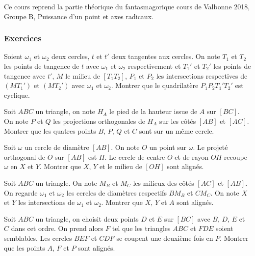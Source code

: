Ce cours reprend la partie théorique du fantasmagorique cours de Valbonne 2018, Groupe B, Puissance d’un point et axes radicaux.


\subsubsection{Exercices}

\begin{exo}
Soient $\omega_1$ et $\omega_2$ deux cercles, $t$ et $t'$ deux tangentes aux cercles. On note $T_1$ et $T_2$ les points de tangence de $t$ avec $\omega_1$ et $\omega_2$ respectivement et $T_1'$ et $T_2'$ les points de tangence avec $t'$, $M$ le milieu de $[T_1T_2]$, $P_1$ et $P_2$ les intersections respectives de $(MT_1')$ et $(MT_2')$ avec $\omega_1$ et $\omega_2$. Montrer que le quadrilatère $P_1P_2T_1'T_2'$ est cyclique.
\end{exo}

\begin{exo}
Soit $ABC$ un triangle, on note $H_A$ le pied de la hauteur issue de $A$ sur $[BC]$. On note $P$ et $Q$ les projections orthogonales de $H_A$ sur les côtés $[AB]$ et $[AC]$. Montrer que les quatres points $B$, $P$, $Q$ et $C$ sont sur un même cercle.
\end{exo}

\begin{exo}
Soit $\omega$ un cercle de diamètre $[AB]$. On note $O$ un point sur $\omega$. Le projeté orthogonal de $O$ sur $[AB]$ est $H$. Le cercle de centre $O$ et de rayon $OH$ recoupe $\omega$ en $X$ et $Y$. Montrer que $X$, $Y$ et le milieu de $[OH]$ sont alignés.
\end{exo}

\begin{exo}
Soit $ABC$ un triangle. On note $M_B$ et $M_C$ les milieux des côtés $[AC]$ et $[AB]$. On regarde $\omega_1$ et $\omega_2$ les cercles de diamètres respectifs $BM_B$ et $CM_C$. On note $X$ et $Y$ les intersections de $\omega_1$ et $\omega_2$. Montrer que $X$, $Y$ et $A$ sont alignés.
\end{exo}

\begin{exo}
Soit $ABC$ un triangle, on choisit deux points $D$ et $E$ sur $[BC]$ avec $B$, $D$, $E$ et $C$ dans cet ordre. On prend alors $F$ tel que les triangles $ABC$ et $FDE$ soient semblables. Les cercles $BEF$ et $CDF$ se coupent une deuxième fois en $P$. Montrer que les points $A$, $F$ et $P$ sont alignés.
\end{exo}

